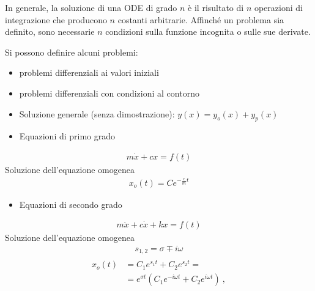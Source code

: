 \documentclass[letterpaper,10pt,english]{jupyterBook}
\begin{document}
\sphinxAtStartPar
In generale, la soluzione di una ODE di grado \(n\) è il risultato di \(n\) operazioni di integrazione che producono \(n\) costanti arbitrarie. Affinché un problema sia definito, sono necessarie \(n\) condizioni sulla funzione incognita o sulle sue derivate.

\sphinxAtStartPar
Si possono definire alcuni problemi:
\begin{itemize}
\item {} 
\sphinxAtStartPar
problemi differenziali ai valori iniziali

\item {} 
\sphinxAtStartPar
problemi differenziali con condizioni al contorno

\end{itemize}

\sphinxAtStartPar
{}
\begin{itemize}
\item {} 
\sphinxAtStartPar
Soluzione generale (senza dimostrazione): \(y(x) = y_o(x) + y_p(x)\)

\item {} 
\sphinxAtStartPar
Equazioni di primo grado

\end{itemize}
\begin{equation*}
\begin{split}m \dot{x} + c x  = f(t)\end{split}
\end{equation*}
\sphinxAtStartPar
Soluzione dell’equazione omogenea
\begin{equation*}
\begin{split}x_o(t) = C e^{-\frac{c}{m} t}\end{split}
\end{equation*}\begin{itemize}
\item {} 
\sphinxAtStartPar
Equazioni di secondo grado

\end{itemize}
\begin{equation*}
\begin{split}m \ddot{x} + c \dot{x} + k x = f(t)\end{split}
\end{equation*}
\sphinxAtStartPar
Soluzione dell’equazione omogenea
\begin{equation*}
\begin{split}s_{1,2} = \sigma \mp i \omega\end{split}
\end{equation*}\begin{equation*}
\begin{split}\begin{aligned}
x_o(t) & = C_1 e^{s_1 t } + C_2 e^{s_2 t} = \\
       & = e^{\sigma t} \left( C_1 e^{-i \omega t } + C_2 e^{i \omega t} \right) \ ,
\end{aligned}\end{split}
\end{equation*}
\end{document}

